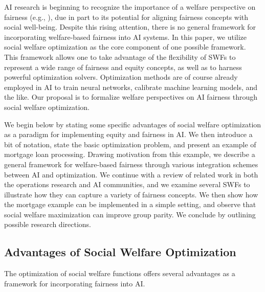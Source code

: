 \documentclass{article}[11pt]
\begin{document}
AI research is beginning to recognize the importance of a welfare perspective on fairness (e.g., \cite{corbett2018measure,hu2020fair}), due in part to its potential for aligning fairness concepts with social well-being. Despite this rising attention, there is no general framework for incorporating welfare-based fairness into AI systems. In this paper, we utilize social welfare optimization as the core component of one possible framework. This framework allows one to take advantage of the flexibility of SWFs to represent a wide range of fairness and equity concepts, as well as to harness powerful optimization solvers.  Optimization methods are of course already employed in AI to train neural networks, calibrate machine learning models, and the like.  Our proposal is to formalize welfare perspectives on AI fairness through social welfare optimization.

We begin below by stating some specific advantages of social welfare optimization as a paradigm for implementing equity and fairness in AI. We then introduce a bit of notation, state the basic optimization problem, and present an example of mortgage loan processing. Drawing motivation from this example, we describe a general framework for welfare-based fairness through various integration schemes between AI and optimization. We continue with a review of related work in both the operations research and AI communities, and we examine several SWFs to illustrate how they can capture a variety of fairness concepts. We then show how the mortgage example can be implemented in a simple setting, and observe that social welfare maximization can improve group parity.  We conclude by outlining possible research directions. 



\subsection{Advantages of Social Welfare Optimization}
The optimization of social welfare functions offers several advantages as a framework for incorporating fairness into AI.
\end{document}
